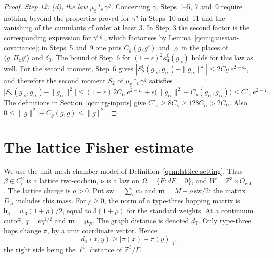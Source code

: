 \documentclass[11pt,letterpaper,reqno]{amsart}
\theoremstyle{definition}
\begin{document}
\begin{proof}
\emph{Step 12: (d), the law $\mu_\xi\ast_\epsilon\gamma^\varrho$.}
Concerning $\gamma$, Steps~1--5, 7 and~9 require nothing beyond the properties proved for $\gamma^\varrho$ in Steps~10 and~11 and the vanishing of the cumulants of order at least $3$.
In Step~3 the second factor is the corresponding expression for $\gamma^{\epsilon\varrho}$, which factorises by Lemma~\ref{qcm:gaussian-covariance}; in Steps~5 and~9 one puts $C_\varrho(g,g')$ and $\varrho$ in the places of $\langle g,\Pi_{\mathrm c}g'\rangle$ and $\delta_0$.
The bound of Step~6 for $(1-\epsilon)^2\kappa_4^\xi(g_{\mathrm{ix}})$ holds for this law as well.
For the second moment, Step~6 gives $|S_2^\xi(g_{\mathrm{ix}},\allowbreak g_{\mathrm{ix}})-\|g_{\mathrm{ix}}\|^2|\le2C_U\,\allowbreak e^{2-\mathfrak e_2}$, and therefore the second moment $S_2$ of $\mu_\xi\ast_\epsilon\gamma^\varrho$ satisfies
\begin{equation*}
\bigl|S_2(g_{\mathrm{ix}},g_{\mathrm{ix}})-\|g_{\mathrm{ix}}\|^2\bigr|\le(1-\epsilon)\,2C_U\,e^{2-\mathfrak e_2}+\epsilon\bigl(\|g_{\mathrm{ix}}\|^2-C_\varrho(g_{\mathrm{ix}},g_{\mathrm{ix}})\bigr)\le C'_{\bar\kappa}\,e^{2-\mathfrak e_2}.
\end{equation*}
The definitions in Section~\ref{qcm:rg-inputs} give $C'_{\bar\kappa}\ge8C_{\bar\kappa}\ge128C_U>2C_U$. Also $0\le\|g\|^2-C_\varrho(g,g)\le\|g\|^2$.
\end{proof}


\section{The lattice Fisher estimate}

We use the unit-mesh chamber model of Definition~\ref{qcm:lattice-setting}.
Thus $\beta\in C^2_{\mathrm c}$ is a lattice two-cochain, $\nu$ is a law
on $\Omega=\{F:dF=0\}$, and $W=\mathbb Z^3\rtimes O_{\mathrm{cub}}$.
The lattice charge is $q>0$. Put $\mathrm{sw}=\sum_iw_i$ and
$\mathbf m=M-\rho\,\mathrm{sw}/2$; the matrix $D_A$ includes this mass.
For $\rho\ge0$, the norm of a type-three hopping matrix is
$\mathsf h_3=w_3(1+\rho)/2$, equal to $3(1+\rho)$ for the standard weights.
At a continuum cutoff, $q=e\eta^{1/2}$ and $\mathbf m=\boldsymbol\mu_N$.
The graph distance is denoted $d_{\mathbb T}$. Only type-three hops
change $\pi$, by a unit coordinate vector.
Hence
\begin{equation*}
d_{\mathbb T}(x,y)\ge|\pi(x)-\pi(y)|_1,
\end{equation*}
the right side being the $\ell^1$ distance of $\mathbb Z^3/\Gamma$.
\end{document}
